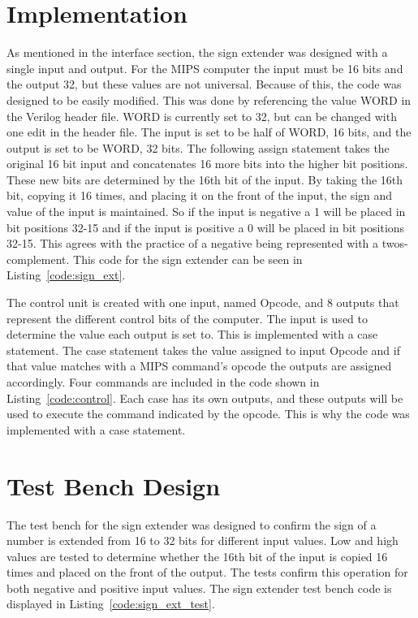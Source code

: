 \documentclass{article}
\newcommand{\Verilog}[3]{
  \lstset{language=Verilog}
  \lstset{backgroundcolor=\color{listinggray},rulecolor=\color{blue}}
  \lstset{linewidth=\textwidth}
  \lstset{commentstyle=\textit, stringstyle=\upshape,showspaces=false}
  \lstset{frame=tb}
  
}
\begin{document}
\section{Implementation}
As mentioned in the interface section, the sign extender was designed with a single input and output. For the MIPS computer the input must be 16 bits and the output 32, but these values are not universal. Because of this, the code was designed to be easily modified. This was done by referencing the value WORD in the Verilog header file. WORD is currently set to 32, but can be changed with one edit in the header file. The input is set to be half of WORD, 16 bits, and the output is set to be WORD, 32 bits. The following assign statement takes the original 16 bit input and concatenates 16 more bits into the higher bit positions. These new bits are determined by the 16th bit of the input. By taking the 16th bit, copying it 16 times, and placing it on the front of the input, the sign and value of the input is maintained. So if the input is negative a 1 will be placed in bit positions 32-15 and if the input is positive a 0 will be placed in bit positions 32-15. This agrees with the practice of a negative being represented with a twos-complement. This code for the sign extender can be seen in Listing~\ref{code:sign_ext}.

The control unit is created with one input, named Opcode, and 8 outputs that represent the different control bits of the computer. The input is used to determine the value each output is set to. This is implemented with a case statement. The case statement takes the value assigned to input Opcode and if that value matches with a MIPS command's opcode the outputs are assigned accordingly. Four commands are included in the code shown in Listing~\ref{code:control}. Each case has its own outputs, and these outputs will be used to execute the command indicated by the opcode. This is why the code was implemented with a case statement.

\Verilog{Verilog code for implementing a sign extender.}{code:sign_ext}{H:/MIPS-Lab/code/2_decode/sign_extender.v}

\Verilog{Verilog code for implementing a control unit.}{code:control}{H:/MIPS-Lab/code/2_decode/control.v}

\section{Test Bench Design}
The test bench for the sign extender was designed to confirm the sign of a number is extended from 16 to 32 bits for different input values. Low and high values are tested to determine whether the 16th bit of the input is copied 16 times and placed on the front of the output. The tests confirm this operation for both negative and positive input values. The sign extender test bench code is displayed in Listing~\ref{code:sign_ext_test}.
\end{document}
